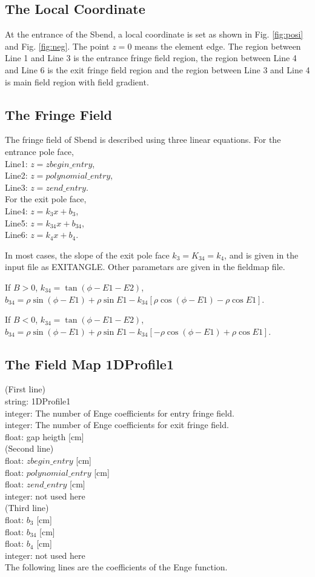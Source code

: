 \documentclass{article}
\begin{document}
\subsection{The Local Coordinate}
At the entrance of the Sbend, a local coordinate is set as shown in
Fig. \ref{fig:posi} and Fig. \ref{fig:neg}. The point $z=0$ means
the element edge. The region between Line 1 and Line 3 is the
entrance fringe field region, the region between Line 4 and Line 6
is the exit fringe field region and the region between Line 3 and
Line 4 is main field region with field gradient.
\subsection{The Fringe Field}
The fringe field of Sbend is described using three linear equations.
For the
entrance pole face, \\
Line1: $z=zbegin\_entry$,\\
Line2: $z=polynomial\_entry$,\\
Line3: $z=zend\_entry$. \\For the
exit pole face, \\Line4: $z=k_3x+b_3$, \\Line5: $z=k_{34} x+b_{34}$,\\
Line6: $z=k_4x+b_4$.

In most cases, the slope of the exit pole face $k_3=K_{34}=k_4$, and is given in the input file as EXITANGLE. Other parametars are given in the fieldmap file.


If $B>0$,
$k_{34}=\tan(\phi-E1-E2)$,
\\$b_{34}=\rho\sin(\phi-E1)+\rho\sin
E1-k_{34}[\rho\cos(\phi-E1)-\rho\cos E1]$.


If $B<0$, $k_{34}=\tan(\phi-E1-E2)$,\\ $b_{34}=\rho\sin(\phi-E1)+\rho\sin
E1-k_{34}[-\rho\cos(\phi-E1)+\rho\cos E1]$.

\subsection{The Field Map 1DProfile1}
(First line) \\
string: 1DProfile1\\
integer: The number of Enge coefficients for entry fringe field.\\
integer: The number of Enge coefficients for exit fringe field.\\
float: gap heigth [cm]\\
(Second line) \\
float: $zbegin\_entry$ [cm]\\
float: $polynomial\_entry$ [cm]\\
float: $zend\_entry$ [cm]\\
integer: not used here\\
(Third line)\\
float: $b_3$ [cm]\\
float: $b_{34}$ [cm]\\
float: $b_4$ [cm]\\
integer: not used here\\
The following lines are the coefficients of the Enge function.
\end{document}
